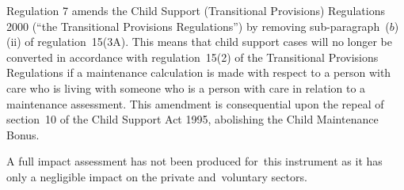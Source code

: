 \documentclass[12pt,a4paper]{article}
\begin{document}
Regulation 7 amends the Child Support (Transitional Provisions) Regulations 2000 (“the Transitional Provisions Regulations”) by removing sub-paragraph~($b$)(ii)  of regulation~15(3A). This means that child support cases will no longer be converted in accordance with regulation~15(2) of the Transitional Provisions Regulations if a maintenance calculation is made with respect to a person with care who is living with someone who is a person with care in relation to a maintenance assessment. This amendment is consequential upon the repeal of section~10 of the Child Support Act 1995, abolishing the Child Maintenance Bonus.

A full impact assessment has not been produced for~this instrument as it has only a negligible impact on the private and~voluntary sectors. 
\end{document}

